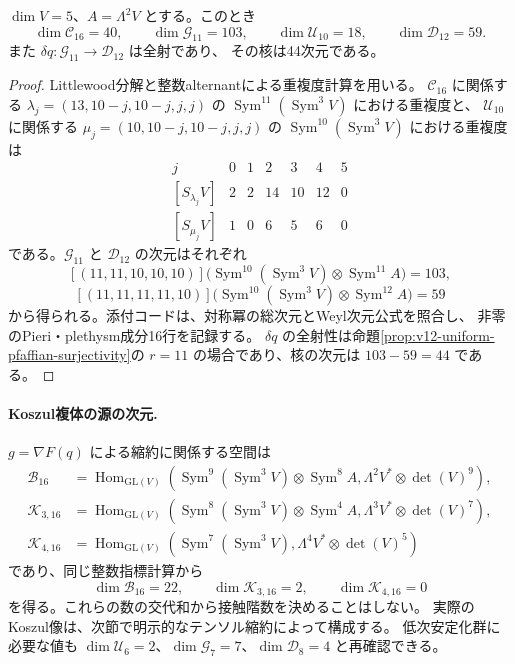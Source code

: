 \begin{proposition}[16次の次元]
\label{prop:v13-sixteenth-characters}
$\dim V=5$、$A=\Lambda^2V$ とする。このとき
\[
 \dim\mathcal C_{16}=40,\qquad
 \dim\mathcal G_{11}=103,\qquad
 \dim\mathcal U_{10}=18,\qquad
 \dim\mathcal D_{12}=59.
\]
また $\delta q:\mathcal G_{11}\to\mathcal D_{12}$ は全射であり、
その核は44次元である。
\end{proposition}
\begin{proof}
Littlewood分解と整数alternantによる重複度計算を用いる。
$\mathcal C_{16}$ に関係する
$\lambda_j=(13,10-j,10-j,j,j)$ の
$\operatorname{Sym}^{11}(\operatorname{Sym}^3V)$ における重複度と、
$\mathcal U_{10}$ に関係する
$\mu_j=(10,10-j,10-j,j,j)$ の
$\operatorname{Sym}^{10}(\operatorname{Sym}^3V)$ における重複度は
\[
\begin{array}{c|rrrrrr}
 j&0&1&2&3&4&5\\\hline
 {}[S_{\lambda_j}V]&2&2&14&10&12&0\\
 {}[S_{\mu_j}V]&1&0&6&5&6&0
\end{array}
\]
である。$\mathcal G_{11}$ と $\mathcal D_{12}$ の次元はそれぞれ
\[
 [(11,11,10,10,10)]
 \bigl(\operatorname{Sym}^{10}(\operatorname{Sym}^3V)
                    \otimes\operatorname{Sym}^{11}A\bigr)=103,
\]
\[
 [(11,11,11,11,10)]
 \bigl(\operatorname{Sym}^{10}(\operatorname{Sym}^3V)
                    \otimes\operatorname{Sym}^{12}A\bigr)=59
\]
から得られる。添付コードは、対称冪の総次元とWeyl次元公式を照合し、
非零のPieri・plethysm成分16行を記録する。
$\delta q$ の全射性は命題\ref{prop:v12-uniform-pfaffian-surjectivity}の
$r=11$ の場合であり、核の次元は $103-59=44$ である。
\end{proof}

\paragraph{Koszul複体の源の次元.}
$g=\nabla F(q)$ による縮約に関係する空間は
\begin{align*}
 \mathcal B_{16}&=\operatorname{Hom}_{\mathrm{GL}(V)}
 \left(\operatorname{Sym}^{9}(\operatorname{Sym}^3V)\otimes\operatorname{Sym}^{8}A,
        \Lambda^2V^*\otimes\det(V)^9\right),\\
 \mathcal K_{3,16}&=\operatorname{Hom}_{\mathrm{GL}(V)}
 \left(\operatorname{Sym}^{8}(\operatorname{Sym}^3V)\otimes\operatorname{Sym}^{4}A,
        \Lambda^3V^*\otimes\det(V)^7\right),\\
 \mathcal K_{4,16}&=\operatorname{Hom}_{\mathrm{GL}(V)}
 \left(\operatorname{Sym}^{7}(\operatorname{Sym}^3V),
        \Lambda^4V^*\otimes\det(V)^5\right)
\end{align*}
であり、同じ整数指標計算から
\[
 \dim\mathcal B_{16}=22,\qquad
 \dim\mathcal K_{3,16}=2,\qquad
 \dim\mathcal K_{4,16}=0
\]
を得る。これらの数の交代和から接触階数を決めることはしない。
実際のKoszul像は、次節で明示的なテンソル縮約によって構成する。
低次安定化群に必要な値も
$\dim\mathcal U_6=2$、$\dim\mathcal G_7=7$、$\dim\mathcal D_8=4$ と再確認できる。

